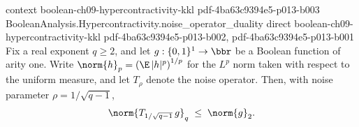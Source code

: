 \begin{theorem}
  {context}
  {boolean-ch09-hypercontractivity-kkl}
  {pdf-4ba63c9394e5-p013-b003}
\proofstep
  {BooleanAnalysis.Hypercontractivity.noise_operator_duality}
  {direct}
  {boolean-ch09-hypercontractivity-kkl}
  {pdf-4ba63c9394e5-p013-b002,
    pdf-4ba63c9394e5-p013-b001}
Fix a real exponent $q \ge 2$, and let $g : \{0,1\}^1 \to \bbr$ be a Boolean function of
arity one. Write $\norm{h}_p = \left(\E\,|h|^{p}\right)^{1/p}$ for the $L^p$ norm taken
with respect to the uniform measure, and let $T_\rho$ denote the noise operator. Then,
with noise parameter $\rho = 1/\sqrt{q-1}$,
\[
  \norm{T_{1/\sqrt{q-1}}\, g}_q \;\le\; \norm{g}_2 .
\]
\end{theorem}
